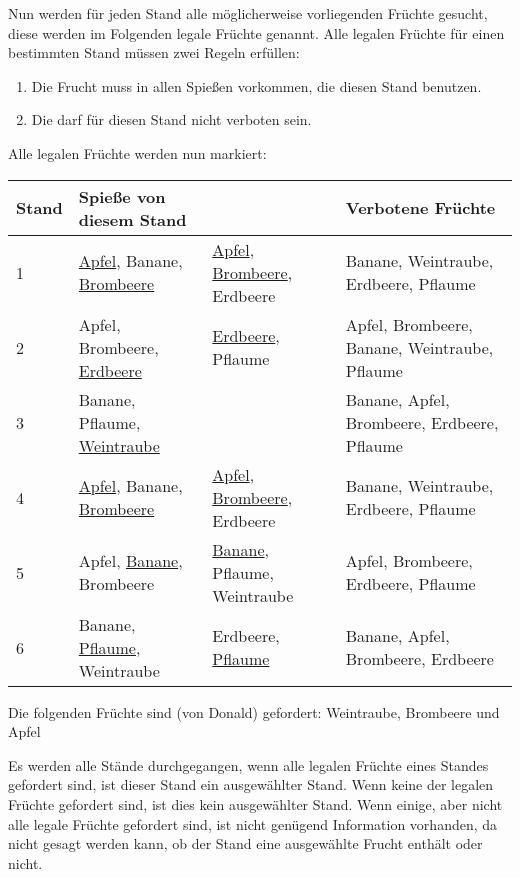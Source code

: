 \documentclass[a4paper,10pt,ngerman]{scrartcl}
\begin{document}
Nun werden für jeden Stand alle möglicherweise vorliegenden Früchte gesucht, diese werden im Folgenden legale Früchte genannt.
Alle legalen Früchte für einen bestimmten Stand müssen zwei Regeln erfüllen:
\begin{enumerate}
    \item Die Frucht muss in allen Spießen vorkommen, die diesen Stand benutzen.
    \item Die darf für diesen Stand nicht verboten sein.
\end{enumerate}
Alle legalen Früchte werden nun markiert:

\begin{center}
\begin{tabularx}{\linewidth}{l|X|X|X}
    \textbf{Stand} & \textbf{Spieße von diesem Stand} & & \textbf{Verbotene Früchte} \\
    \hline
    1 & \underline{Apfel}, Banane, \underline{Brombeere} & \underline{Apfel}, \underline{Brombeere}, Erdbeere & Banane, Weintraube, Erdbeere, Pflaume \\
    \hline
    2 & Apfel, Brombeere, \underline{Erdbeere} & \underline{Erdbeere}, Pflaume & Apfel, Brombeere, Banane, Weintraube, Pflaume \\
    \hline
    3 & Banane, Pflaume, \underline{Weintraube} & & Banane, Apfel, Brombeere, Erdbeere, Pflaume \\
    \hline
    4 & \underline{Apfel}, Banane, \underline{Brombeere} & \underline{Apfel}, \underline{Brombeere}, Erdbeere & Banane, Weintraube, Erdbeere, Pflaume \\
    \hline
    5 & Apfel, \underline{Banane}, Brombeere & \underline{Banane}, Pflaume, Weintraube & Apfel, Brombeere, Erdbeere, Pflaume \\
    \hline
    6 & Banane, \underline{Pflaume}, Weintraube & Erdbeere, \underline{Pflaume} & Banane, Apfel, Brombeere, Erdbeere
\end{tabularx}
\end{center}

Die folgenden Früchte sind (von Donald) gefordert: Weintraube, Brombeere und Apfel

Es werden alle Stände durchgegangen, wenn alle legalen Früchte eines Standes gefordert sind, ist dieser Stand ein ausgewählter Stand.
Wenn keine der legalen Früchte gefordert sind, ist dies kein ausgewählter Stand.
Wenn einige, aber nicht alle legale Früchte gefordert sind, ist nicht genügend Information vorhanden, da nicht gesagt werden kann, ob der Stand eine ausgewählte Frucht enthält oder nicht.
\end{document}
